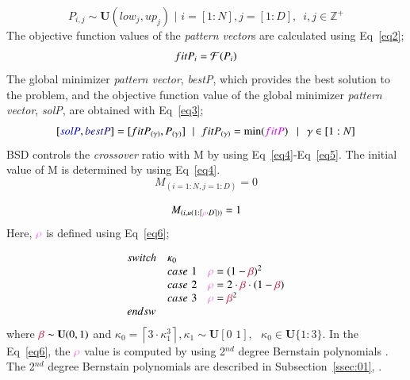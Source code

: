 \documentclass[preprint,10pt,3p]{elsarticle}
\begin{document}
\begin{equation} \label{eq1}
P_{i,j} \sim \textbf{U}(low_{j},up_{j})\,\, | \,\, i = [1:N], j = [1:D] ,\,\,\,i,j \in \mathbb{Z}^{+}
\end{equation}
The objective function values ​​of the \emph{pattern vector}s are calculated using Eq~\ref{eq2};
\begin{equation}\label{eq2}
  fit{P_i} = {\cal F}({P_i})
\end{equation}
The global minimizer \emph{pattern vector}, \emph{\textcolor{ultramarine}{bestP}}, which provides the best solution to the problem, and the objective function value of the global minimizer \emph{pattern vector}, \emph{\textcolor{ao}{solP}}, are obtained with Eq~\ref{eq3};
\begin{equation}\label{eq3}
  [\textcolor{ao}{solP},\textcolor{ultramarine}{bestP}] = [fit{P_{(\gamma )}},{P_{(\gamma )}}]{\mkern 1mu} \,\,\,{\mkern 1mu} |\,\,\,{\mkern 1mu} {\mkern 1mu} fit{P_{(\gamma )}} = \min (\textcolor{psychedelicpurple}{fitP}){\mkern 1mu} {\mkern 1mu} \,\,\,\,|{\mkern 1mu} \,\,\,\,\gamma  \in [1:N]
\end{equation}
\textcolor{bluebell}{BSD} controls the \emph{crossover} ratio with M by using Eq~\ref{eq4}-Eq~\ref{eq5}. The initial value of M is determined by using Eq~\ref{eq4}.
\begin{equation}\label{eq4}
 M_{(i=1:N,j=1:D)}=0
\end{equation}

\begin{equation}\label{eq5}
  {M_{\left( {i,u\left( {1:\left\lceil {\textcolor{amethyst}{\rho}  \cdot D} \right\rceil } \right)} \right)}} = 1
\end{equation}
Here, $\textcolor{amethyst}{\rho}$ is defined using Eq~\ref{eq6};

\begin{equation}\label{eq6}
\begin{array}{*{20}{l}}
{switch}&\kappa_{0}&{}\\
{}&{case\,\,1}&{\textcolor{amethyst}{\rho}  = {{(1 - \textcolor{alizarin}{\beta})}^2}}\\
{}&{case\,\,2}&{\textcolor{amethyst}{\rho}  = 2\cdot \textcolor{alizarin}{\beta}\cdot(1 - \textcolor{alizarin}{\beta})}\\
{}&{case\,\,3}&{\textcolor{amethyst}{\rho}  = {\textcolor{alizarin}{\beta}^2}}\\
{endsw}&{}&{}
\end{array}
\end{equation}
where $\textcolor{alizarin}{\beta} \sim {\bf{U}}(0,1)$ and  $\kappa_{0} = \left \lceil {3 \cdot \kappa _{1}^3} \right \rceil , \kappa _{1} \sim \textbf{U}[0 \,\, 1],\,\,\,\, \kappa _{0} \in \textbf{U}\{1:3\}$.  In the Eq~\ref{eq6}, the $\textcolor{amethyst}{\rho}$ value is computed by using 2$^{nd}$ degree Bernstain polynomials \citep{30}. The 2$^{nd}$ degree Bernstain polynomials are described in Subsection~\ref{ssec:01}, \textcolor{blue} {}.
\end{document}
